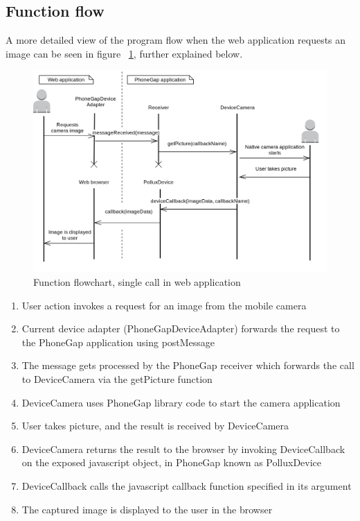 \subsection{Function flow}\label{sec:phonegapflow}
A more detailed view of the program flow when the web application requests an image can be seen in figure ~\ref{fig:phonegapflow}, further explained below.
\begin{figure}[h!]
	\centering
    \includegraphics[width=120mm,natwidth=800,natheight=600]{./img/phonegapfunctionflow.png}
    \caption{Function flowchart, single call in web application} \label{fig:phonegapflow}
\end{figure}
\begin{enumerate}
	\item User action invokes a request for an image from the mobile camera 
	\item Current device adapter (PhoneGapDeviceAdapter) forwards the request to the PhoneGap application using postMessage
	\item The message gets processed by the PhoneGap receiver which forwards the call to DeviceCamera via the getPicture function
	\item DeviceCamera uses PhoneGap library code to start the camera application
	\item User takes picture, and the result is received by DeviceCamera
	\item DeviceCamera returns the result to the browser by invoking DeviceCallback on the exposed javascript object, in PhoneGap known as PolluxDevice
	\item DeviceCallback calls the javascript callback function specified in its argument
	\item The captured image is displayed to the user in the browser	
\end{enumerate}

